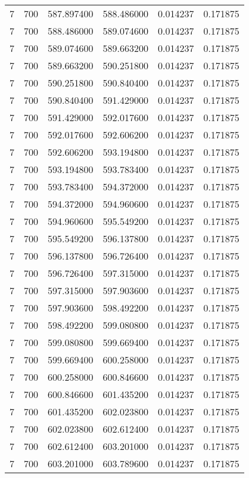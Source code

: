 \begin{longtable}{rrrrrr}
7 & 700 & 587.897400 & 588.486000 & 0.014237 & 0.171875 \\
7 & 700 & 588.486000 & 589.074600 & 0.014237 & 0.171875 \\
7 & 700 & 589.074600 & 589.663200 & 0.014237 & 0.171875 \\
7 & 700 & 589.663200 & 590.251800 & 0.014237 & 0.171875 \\
7 & 700 & 590.251800 & 590.840400 & 0.014237 & 0.171875 \\
7 & 700 & 590.840400 & 591.429000 & 0.014237 & 0.171875 \\
7 & 700 & 591.429000 & 592.017600 & 0.014237 & 0.171875 \\
7 & 700 & 592.017600 & 592.606200 & 0.014237 & 0.171875 \\
7 & 700 & 592.606200 & 593.194800 & 0.014237 & 0.171875 \\
7 & 700 & 593.194800 & 593.783400 & 0.014237 & 0.171875 \\
7 & 700 & 593.783400 & 594.372000 & 0.014237 & 0.171875 \\
7 & 700 & 594.372000 & 594.960600 & 0.014237 & 0.171875 \\
7 & 700 & 594.960600 & 595.549200 & 0.014237 & 0.171875 \\
7 & 700 & 595.549200 & 596.137800 & 0.014237 & 0.171875 \\
7 & 700 & 596.137800 & 596.726400 & 0.014237 & 0.171875 \\
7 & 700 & 596.726400 & 597.315000 & 0.014237 & 0.171875 \\
7 & 700 & 597.315000 & 597.903600 & 0.014237 & 0.171875 \\
7 & 700 & 597.903600 & 598.492200 & 0.014237 & 0.171875 \\
7 & 700 & 598.492200 & 599.080800 & 0.014237 & 0.171875 \\
7 & 700 & 599.080800 & 599.669400 & 0.014237 & 0.171875 \\
7 & 700 & 599.669400 & 600.258000 & 0.014237 & 0.171875 \\
7 & 700 & 600.258000 & 600.846600 & 0.014237 & 0.171875 \\
7 & 700 & 600.846600 & 601.435200 & 0.014237 & 0.171875 \\
7 & 700 & 601.435200 & 602.023800 & 0.014237 & 0.171875 \\
7 & 700 & 602.023800 & 602.612400 & 0.014237 & 0.171875 \\
7 & 700 & 602.612400 & 603.201000 & 0.014237 & 0.171875 \\
7 & 700 & 603.201000 & 603.789600 & 0.014237 & 0.171875 \\

\end{longtable}
